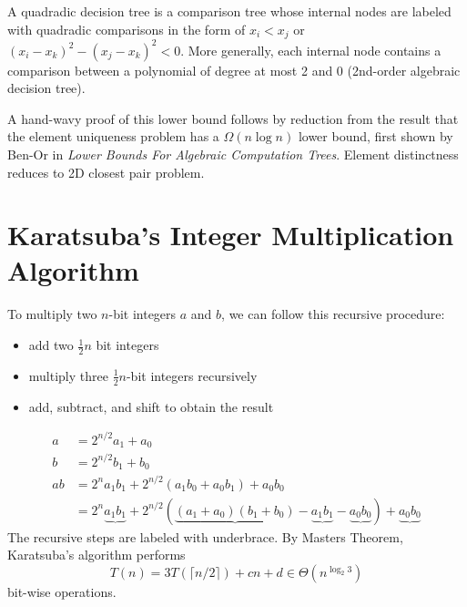 A quadradic decision tree is a comparison tree whose internal nodes are labeled with quadradic comparisons in the form of $x_i < x_j$ or $(x_i - x_k)^2 - (x_j - x_k)^2 < 0$. More generally, each internal node contains a comparison between a polynomial of degree at most 2 and 0 (2nd-order algebraic decision tree).

A hand-wavy proof of this lower bound follows by reduction from the result that the element uniqueness problem has a $\Omega(n \log n)$ lower bound, first shown by Ben-Or in \textit{Lower Bounds For Algebraic Computation Trees}. Element distinctness reduces to 2D closest pair problem.

\section{Karatsuba's Integer Multiplication Algorithm}

To multiply two $n$-bit integers $a$ and $b$, we can follow this recursive procedure:
\begin{itemize}
    \item add two $\frac{1}{2}n$ bit integers
    \item multiply three $\frac{1}{2}n$-bit integers recursively
    \item add, subtract, and shift to obtain the result
\end{itemize}

$$
\begin{aligned}
    a &= 2^{n/2} a_1 + a_0 \\
    b &= 2^{n/2} b_1 + b_0 \\
    ab &= 2^n a_1b_1 + 2^{n/2} (a_1b_0 + a_0b_1) + a_0b_0 \\
    &= 2^n \underbrace{a_1b_1} + 2^{n/2} (\underbrace{(a_1+a_0)(b_1+b_0)} - \underbrace{a_1b_1} - \underbrace{a_0b_0}) + \underbrace{a_0b_0}
\end{aligned}
$$
The recursive steps are labeled with underbrace. By Masters Theorem, Karatsuba's algorithm performs
$$
T(n)=3T(\lceil n/2\rceil )+cn+d \in \Theta(n^{\log_2 3})
$$
bit-wise operations.